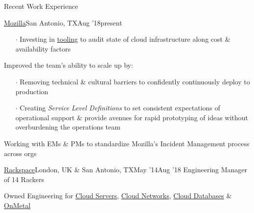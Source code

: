 \documentclass{resume} %
\begin{document}
\begin{rSection}{Recent Work Experience}
\begin{rSubsection}{\href{https://www.mozilla.org/}{Mozilla}}{San Antonio, TX}{Aug '18}{present}
\begin{itemize}
    \item[$\cdot$] Investing in \href{https://github.com/mozilla/frost}{tooling} to audit state of cloud infrastructure along cost \& availability factors
    \end{itemize}
  \item Improved the team's ability to scale up by:
     \vspace{-0.5em}
    \begin{itemize} \itemsep0.5pt \parskip0pt 
  \item[$\cdot$] Removing technical \& cultural barriers to confidently continuously deploy to production
  \item[$\cdot$] Creating \textit{Service Level Definitions} to set consistent expectations of operational support \& provide avenues for rapid prototyping of ideas without overburdening the operations team
        \end{itemize}
  \item Working with EMs \& PMs to standardize Mozilla's Incident Management process across orgs
\end{rSubsection}


\begin{rSubsection}{\href{https://www.rackspace.com/}{Rackspace}}{London, UK \& San Antonio, TX}{May '14}{Aug '18}
  {Engineering Manager of 14 Rackers}
  \item Owned Engineering for \href{https://www.rackspace.com/openstack/public/servers}{Cloud Servers}, \href{https://www.rackspace.com/openstack/public/networks}{Cloud Networks}, \href{https://www.rackspace.com/openstack/public/databases}{Cloud Databases} \& \href{https://www.rackspace.com/openstack/public/servers/onmetal}{OnMetal}



\end{rSubsection}
\end{rSection}
\end{document}
